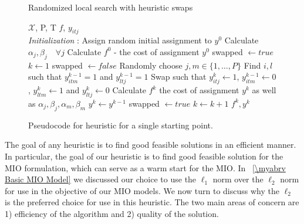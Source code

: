 \begin{figure}[ht] 
 \removelatexerror
\begin{algorithm}[H]
 \caption{Randomized local search with heuristic swaps}
 \label{alg:Basic_Heuristic}
 \begin{algorithmic}[1]
  \renewcommand{\algorithmicrequire}{\textbf{Input:}}
  \renewcommand{\algorithmicensure}{\textbf{Output:}}
 \REQUIRE $\boldsymbol{\mathcal{X}}$, P, T
 \ENSURE  $f$, $y_{itj}$
 \\ \textit{Initialization} : Assign random initial assignment to $y^{0}$
  \STATE Calculate $\alpha_{j}, \beta_{j} \quad \forall j $
  \STATE Calculate $f^{0}$ - the cost of assignment $y^{0}$
  \STATE swapped $\leftarrow true$
  \STATE $k\leftarrow1$
  \STATE swapped $\leftarrow false$
  \STATE Randomly choose $j,m\in\{1,\ldots,P\}$
  \STATE Find $i,l$ such that $y^{k-1}_{itm}=1$ and $y^{k-1}_{ltj}=1$
  \STATE Swap such that $y^{k}_{itj}\leftarrow1$, $y^{k-1}_{itm}\leftarrow 0$, $y^{k}_{ltm}\leftarrow1$ and $y^{k}_{ltj}\leftarrow0$
  \STATE Calculate $f^{k}$ the cost of assignment $y^k$ as well as $\alpha_{j}, \beta_{j}, \alpha_{m}, \beta_{m}$
  \STATE $y^{k} \leftarrow y^{k-1}$
  \ELSE 
  \STATE swapped $\leftarrow true$
  \ENDIF
  \ENDFOR
  \STATE $ k \leftarrow k + 1 $
  \ENDWHILE
 \RETURN $f^{k}, y^{k}$ 
 \end{algorithmic} 
 \end{algorithm}
  \caption{Pseudocode for heuristic for a single starting point.}
  \label{fig:Basic_Heuristic}
 \end{figure}

The goal of any heuristic is to find good feasible solutions in an efficient manner. In particular, the goal of our heuristic is to find good feasible solution for the MIO formulation, which can serve as a warm start for the MIO. In \mysection~\ref{\myabrv Basic MIO Model} we discussed our choice to use the $\ell_1$ norm over the $\ell_2$ norm for use in the objective of our MIO models. We now turn to discuss why the $\ell_2$ is the preferred choice for use in this heuristic. The two main areas of concern are 1) efficiency of the algorithm and 2) quality of the solution.

